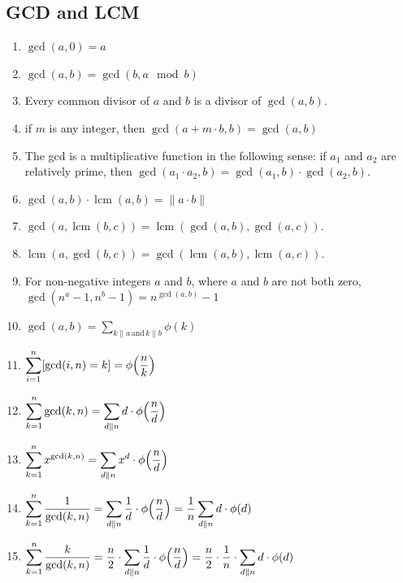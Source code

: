 \subsection{GCD and LCM}
\begin{enumerate}
\item $\displaystyle \gcd(a, 0) = a$
\item $\displaystyle \gcd(a, b) = \gcd(b, a \mod b)$
\item Every common divisor of $\displaystyle a$ and $b$ is a divisor of $\displaystyle \gcd(a,b)$.
\item if $m$ is any integer, then $\displaystyle \gcd(a + m {\cdot} b, b) = \gcd(a, b)$
\item The gcd is a multiplicative function in the following sense: if $\displaystyle a_1$ and $\displaystyle a_2$ are relatively prime, then $\displaystyle \gcd(a_1 \cdot a_2, b) = \gcd(a_1, b) \cdot \gcd(a_2,b )$.
\item $\displaystyle \gcd(a, b){\cdot} \operatorname{lcm}(a, b) = \|a{\cdot}b\|$
\item $\displaystyle \gcd(a, \operatorname{lcm}(b, c)) = \operatorname{lcm}(\gcd(a, b), \gcd(a, c))$.
\item $\displaystyle \operatorname{lcm}(a, \gcd(b, c)) = \gcd(\operatorname{lcm}(a, b), \operatorname{lcm}(a, c))$.
\item For non-negative integers $\displaystyle a$ and $b$, where $\displaystyle a$ and $b$ are not both zero, $\displaystyle \gcd({n^a} - 1, {n^b} - 1) = n^{\gcd(a,b)} - 1$
\item $\displaystyle \gcd(a, b) = \displaystyle \sum_{k\|a \, \text{and} \, k\|b} {\phi(k)}$  
\item $\displaystyle \displaystyle \sum_{i=1}^n [\gcd(i, n) = k] = { \phi{\left(\frac{n}{k}\right)}}$
\item $\displaystyle \displaystyle \sum_{k=1}^n \gcd(k, n) = \displaystyle \sum_{d\|n} d \cdot {\phi{\left(\frac{n}{d}\right)}}$
\item $\displaystyle \displaystyle \sum_{k=1}^n x^{\gcd(k,n)} = \displaystyle \sum_{d\|n} x^d \cdot {\phi{\left(\frac{n}{d}\right)}}$
\item $\displaystyle \displaystyle \sum_{k=1}^n \frac{1}{\gcd(k, n)} = \displaystyle \sum_{d\|n} \frac{1}{d} \cdot {\phi{\left(\frac{n}{d}\right)}} = \frac{1}{n} \displaystyle \sum_{d\|n} d \cdot \phi(d)$
\item $\displaystyle \displaystyle \sum_{k=1}^n \frac{k}{\gcd(k, n)} = \frac{n}{2} \cdot \displaystyle \sum_{d\|n} \frac{1}{d} \cdot {\phi{\left(\frac{n}{d}\right)}} = \frac{n}{2} \cdot \frac{1}{n} \cdot \displaystyle \sum_{d\|n} d \cdot \phi(d)$

\end{enumerate}
